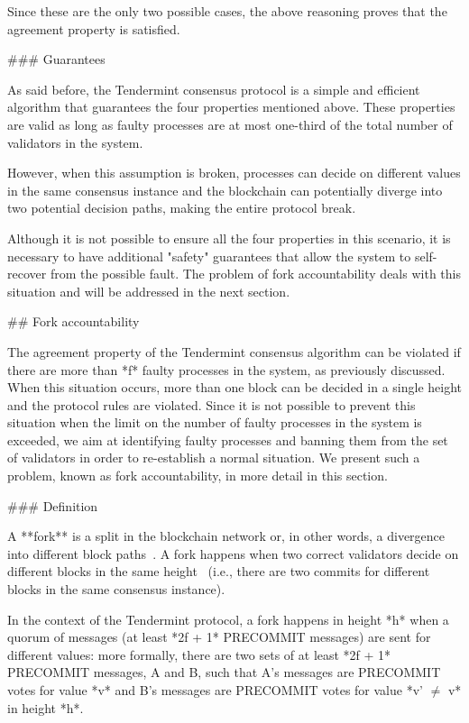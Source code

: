 \documentclass[a4paper,11pt,oneside]{report}
\begin{document}
\begin{markdown}
Since these are the only two possible cases, the above reasoning proves that the agreement property is satisfied.

### Guarantees 

As said before, the Tendermint consensus protocol is a simple and efficient algorithm that guarantees the four properties mentioned above. These properties are valid as long as faulty processes are at most one-third of the total number of validators in the system.

However, when this assumption is broken, processes can decide on different values in the same consensus instance and the blockchain can potentially diverge into two potential decision paths, making the entire protocol break.

Although it is not possible to ensure all the four properties in this scenario, it is necessary to have additional "safety" guarantees that allow the system to self-recover from the possible fault. The problem of fork accountability deals with this situation and will be addressed in the next section.

## Fork accountability

The agreement property of the Tendermint consensus algorithm can be violated if there are more than *f* faulty processes in the system, as previously discussed. When this situation occurs, more than one block can be decided in a single height and the protocol rules are violated. Since it is not possible to prevent this situation when the limit on the number of faulty processes in the system is exceeded, we aim at identifying faulty processes and banning them from the set of validators in order to re-establish a normal situation. We present such a problem, known as fork accountability, in more detail in this section.  

### Definition

A **fork** is a split in the blockchain network or, in other words, a divergence into different block paths~\cite{wiki:fork}. 
A fork happens when two correct validators decide on different blocks in the same height~\cite{fork-accountability-overview} (i.e., there are two commits for different blocks in the same consensus instance). 

In the context of the Tendermint protocol, a fork happens in height *h* when a quorum of messages (at least *2f + 1* PRECOMMIT messages) are sent for different values: more formally, there are two sets of at least *2f + 1* PRECOMMIT messages, A and B, such that A's messages are PRECOMMIT votes for value *v* and B's messages are PRECOMMIT votes for value *v' $\neq$ v* in height *h*.


\end{markdown}
\end{document}
